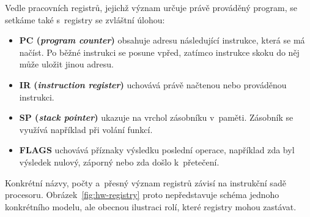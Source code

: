 Vedle pracovních registrů, jejichž význam určuje právě prováděný program, se setkáme také s~registry se zvláštní úlohou:
\begin{itemize}
    \item \textbf{PC (\emph{program counter})} obsahuje adresu následující instrukce, která se má načíst. Po běžné instrukci se posune vpřed, zatímco instrukce skoku do něj může uložit jinou adresu.
    \item \textbf{IR (\emph{instruction register})} uchovává právě načtenou nebo prováděnou instrukci.
    \item \textbf{SP (\emph{stack pointer})} ukazuje na vrchol zásobníku v~paměti. Zásobník se využívá například při volání funkcí.
    \item \textbf{FLAGS} uchovává příznaky výsledku poslední operace, například zda byl výsledek nulový, záporný nebo zda došlo k~přetečení.
\end{itemize}

Konkrétní názvy, počty a~přesný význam registrů závisí na instrukční sadě procesoru. Obrázek~\ref{fig:hw-registry} proto nepředstavuje schéma jednoho konkrétního modelu, ale obecnou ilustraci rolí, které registry mohou zastávat.

